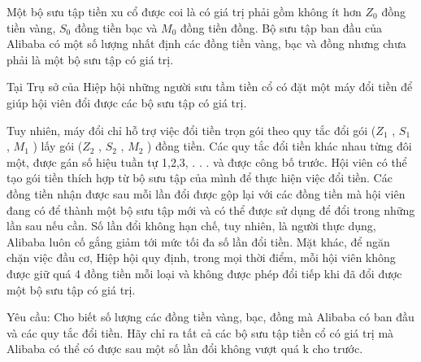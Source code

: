 Một bộ sưu tập tiền xu cổ được coi là có giá trị phải gồm không ít hơn $Z_{0}$ đồng tiền vàng, $S_{0}$ đồng tiền bạc và $M_{0}$ đồng tiền đồng. Bộ sưu tập ban đầu của Alibaba có một số lượng nhất định các đồng tiền vàng, bạc và đồng nhưng chưa phải là một bộ sưu tập có giá trị.

Tại Trụ sở của Hiệp hội những người sưu tầm tiền cổ có đặt một máy đổi tiền để giúp hội viên đổi được các bộ sưu tập có giá trị.

Tuy nhiên, máy đổi chỉ hỗ trợ việc đổi tiền trọn gói theo quy tắc đổi gói ($Z_{1}$ , $S_{1}$ , $M_{1}$ ) lấy gói ($Z_{2}$ , $S_{2}$ , $M_{2}$ ) đồng tiền. Các quy tắc đổi tiền khác nhau từng đôi một, được gán số hiệu tuần tự 1,2,3, . . . và được công bố trước. Hội viên có thể tạo gói tiền thích hợp từ bộ sưu tập của mình để thực hiện việc đổi tiền. Các đồng tiền nhận được sau mỗi lần đổi được gộp lại với các đồng tiền mà hội viên đang có để thành một bộ sưu tập mới và có thể được sử dụng để đổi trong những lần sau nếu cần. Số lần đổi không hạn chế, tuy nhiên, là người thực dụng, Alibaba luôn cố gắng giảm tới mức tối đa số lần đổi tiền. Mặt khác, để ngăn chặn việc đầu cơ, Hiệp hội quy định, trong mọi thời điểm, mỗi hội viên không được giữ quá 4 đồng tiền mỗi loại và không được phép đổi tiếp khi đã đổi được một bộ sưu tập có giá trị.

Yêu cầu: Cho biết số lượng các đồng tiền vàng, bạc, đồng mà Alibaba có ban đầu và các quy tắc đổi tiền. Hãy chỉ ra tất cả các bộ sưu tập tiền cổ có giá trị mà Alibaba có thể có được sau một số lần đổi không vượt quá k cho trước.
